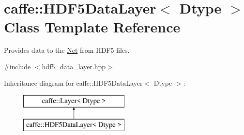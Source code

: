 \hypertarget{classcaffe_1_1HDF5DataLayer}{}\section{caffe\+:\+:H\+D\+F5\+Data\+Layer$<$ Dtype $>$ Class Template Reference}
\label{classcaffe_1_1HDF5DataLayer}


Provides data to the \hyperlink{classcaffe_1_1Net}{Net} from H\+D\+F5 files.  




{\ttfamily \#include $<$hdf5\+\_\+data\+\_\+layer.\+hpp$>$}

Inheritance diagram for caffe\+:\+:H\+D\+F5\+Data\+Layer$<$ Dtype $>$\+:\begin{figure}[H]
\begin{center}
\leavevmode
\includegraphics[height=2.000000cm]{classcaffe_1_1HDF5DataLayer}
\end{center}
\end{figure}
